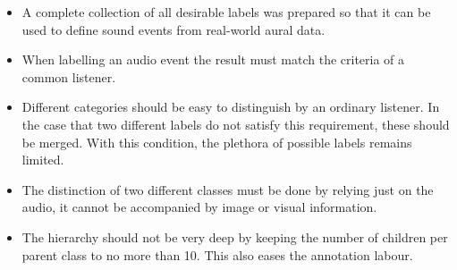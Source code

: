 \begin{itemize}
	\item A complete collection of all desirable labels was prepared so that it can be used to define sound events from real-world aural data.
	\item When labelling an audio event the result must match the criteria of a common listener.
	\item Different categories should be easy to distinguish by an ordinary listener. In the case that two different labels do not satisfy this requirement, these should be merged. With this condition, the plethora of possible labels remains limited.
	\item The distinction of two different classes must be done by relying just on the audio, it cannot be accompanied by image or visual information.
	\item The hierarchy should not be very deep by keeping the number of children per parent class to no more than 10. This also eases the annotation labour. 
\end{itemize}

